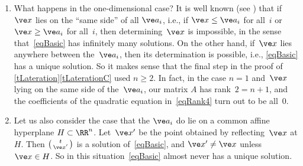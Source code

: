 \documentclass[reqno]{amsart}
\begin{document}
\begin{rem} \label{rLateration}%
  \begin{enumerate}[label=(\alph*)]
  \item \label{rLaterationA} What happens in the one-dimensional case?
    It is well known (see ) that if~$\ve x$ lies on
    the ``same side'' of all $\ve a_i$, i.e., if $\ve x \le \ve a_i$
    for all~$i$ or $\ve x \ge \ve a_i$ for all~$i$, then
    determining~$\ve x$ is impossible, in the sense
    that~\eqref{eqBasic} has infinitely many solutions. On the other
    hand, if~$\ve x$ lies anywhere between the~$\ve a_i$, then its
    determination is possible, i.e., \eqref{eqBasic} has a unique
    solution. So it makes sense that the final step in the proof of
    \cref{tLateration}\ref{tLaterationC} used $n \ge 2$. In fact, in
    the case $n = 1$ and~$\ve x$ lying on the same side of
    the~$\ve a_i$, our matrix $A$ has rank~$2 = n+1$, and the
    coefficients of the quadratic equation in~\eqref{eqRank4} turn out
    to be all~$0$.
    
    

  \item \label{rLaterationB} Let us also consider the case that the
    $\ve a_i$ do lie on a common affine hyperplane $H \subset
    \RR^n$. Let~$\ve x'$ be the point obtained by reflecting~$\ve x$
    at $H$. Then
    $\left(\begin{smallmatrix} t \\ \ve x'\end{smallmatrix}\right)$ is
    a solution of~\eqref{eqBasic}, and $\ve x' \ne \ve x$ unless
    $\ve x \in H$. So in this situation~\eqref{eqBasic} almost never
    has a unique solution. \remend
  \end{enumerate}
  \renewcommand{\remend}{}
\end{rem}
\end{document}

